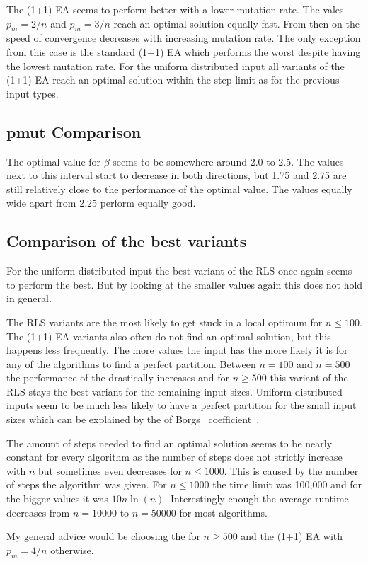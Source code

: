 The (1+1) EA seems to perform better with a lower mutation rate.
The vales $p_m=2/n$ and $p_m=3/n$ reach an optimal solution equally fast.
From then on the speed of convergence decreases with increasing mutation rate.
The only exception from this case is the standard (1+1) EA which performs the worst despite having the lowest mutation rate.
For the uniform distributed input all variants of the (1+1) EA reach an optimal solution within the step limit as for the previous input types.
\subsection{pmut Comparison}


The optimal value for $\beta$ seems to be somewhere around 2.0 to 2.5.
The values next to this interval start to decrease in both directions, but 1.75 and 2.75 are still relatively close to the performance of the optimal value.
The values equally wide apart from 2.25 perform equally good.

\subsection{Comparison of the best variants}


For the uniform distributed input the best variant of the RLS once again seems to perform the best.
But by looking at the smaller values again this does not hold in general.



The RLS variants are the most likely to get stuck in a local optimum for $n\le100$.
The (1+1) EA variants also often do not find an optimal solution, but this happens less frequently.
The more values the input has the more likely it is for any of the algorithms to find a perfect partition.
Between $n=100$ and $n=500$ the performance of the \RLSN[2] drastically increases and for $n\ge500$ this variant of the RLS stays the best variant for the remaining input sizes.
Uniform distributed inputs seem to be much less likely to have a perfect partition for the small input sizes which can be explained by the of Borgs \etal~coefficient~\cite{borgs2001phase}.



The amount of steps needed to find an optimal solution seems to be nearly constant for every algorithm as the number of steps does not strictly increase with $n$ but sometimes even decreases for $n\le1000$.
This is caused by the number of steps the algorithm was given.
For $n\le1000$ the time limit was 100,000 and for the bigger values it was $10n\ln(n)$.
Interestingly enough the average runtime decreases from $n=10000$ to $n=50000$ for most algorithms.



My general advice would be choosing the \RLSN[2] for $n\ge500$ and the (1+1) EA with $p_m=4/n$ otherwise.
